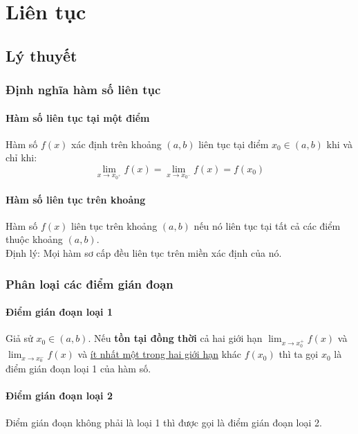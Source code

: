 \chapter{Liên tục}
\section{Lý thuyết}
\subsection{Định nghĩa hàm số liên tục}
\subsubsection{Hàm số liên tục tại một điểm}
Hàm số $f(x)$ xác định trên khoảng $(a,b)$ liên tục tại điểm $x_{0}\in{(a,b)}$ khi và chỉ khi:
\begin{equation} \label{eq:sixth}
\lim_{x\to x_{0^{+}}}f(x)=\lim_{x\to x_{0^{-}}}f(x)=f(x_{0})
\end{equation}
\subsubsection{Hàm số liên tục trên khoảng}
Hàm số $f(x)$ liên tục trên khoảng $(a,b)$ nếu nó liên tục tại tất cả các điểm thuộc khoảng $(a,b)$.
\\ Định lý: Mọi hàm sơ cấp đều liên tục trên miền xác định của nó.
\subsection{Phân loại các điểm gián đoạn}
\subsubsection{Điểm gián đoạn loại 1}
Giả sử $x_{0}\in(a,b)$. Nếu \textbf{tồn tại đồng thời} cả hai giới hạn $\lim_{x\to x_0^+}f(x)$ và $\lim_{x\to x_0^-}f(x)$ và \underline{ít nhất một trong hai giới hạn} khác $f(x_{0})$ thì ta gọi 
$x_{0}$ là điểm gián đoạn loại 1 của hàm số.
\subsubsection{Điểm gián đoạn loại 2}
Điểm gián đoạn không phải là loại 1 thì được gọi là điểm gián đoạn loại 2.

